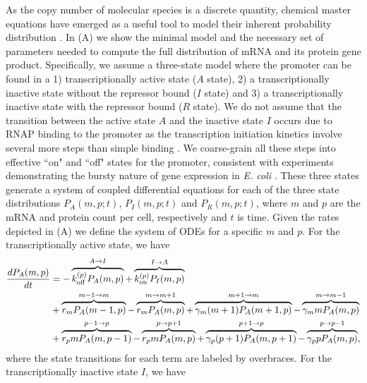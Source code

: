 As the copy number of molecular species is a discrete quantity, chemical master
equations have emerged as a useful tool to model their inherent probability
distribution \cite{Sanchez2013}. In (A) we show the
minimal model and the necessary set of parameters needed to compute the full
distribution of mRNA and its protein gene product. Specifically, we assume a
three-state model where the promoter can be found in a 1) transcriptionally
active state  ($A$ state), 2) a transcriptionally inactive state without the
repressor bound ($I$ state) and 3) a transcriptionally inactive state with the
repressor bound ($R$ state). We do not assume that the transition between the
active state $A$ and the inactive state $I$ occurs due to RNAP binding to the
promoter as the transcription initiation kinetics involve several more steps
than simple binding \cite{Browning2004}. We coarse-grain all these steps into
effective ``on" and ``off" states for the promoter, consistent with experiments
demonstrating the bursty nature of gene expression in {\it E. coli}
\cite{Golding2005}. These three states generate a system of coupled
differential equations for each of the three state distributions $P_A(m, p;
t)$, $P_I(m, p; t)$ and $P_R(m, p; t)$, where $m$ and $p$ are the mRNA and
protein count per cell, respectively and $t$ is time. Given the rates depicted
in (A) we define the system of ODEs for a specific $m$
and $p$. For the transcriptionally active state, we have
\begin{equation}
  \begin{aligned}
    \dt{P_A(m, p)} &=
    - \overbrace{\kpoff P_A(m, p)}^{A \rightarrow I} %
    + \overbrace{\kpon P_I(m, p)}^{I \rightarrow A}\\ %
    &+ \overbrace{r_m P_A(m-1, p)}^{m-1 \rightarrow m} %
    - \overbrace{r_m P_A(m, p)}^{m \rightarrow m+1}%
    + \overbrace{\gm (m + 1) P_A(m+1 , p)}^{m+1 \rightarrow m} %
    - \overbrace{\gm m P_A(m , p)}^{m \rightarrow m-1}\\ %
    &+ \overbrace{r_p m P_A(m, p - 1)}^{p-1 \rightarrow p} %
    - \overbrace{r_p m P_A(m, p)}^{p \rightarrow p+1} %
    + \overbrace{\gp (p + 1) P_A(m, p + 1)}^{p + 1 \rightarrow p} %
    - \overbrace{\gp p P_A(m, p)}^{p \rightarrow p-1}, %
  \end{aligned}
\end{equation}
where the state transitions for each term are labeled by overbraces. For the
transcriptionally inactive state $I$, we have
